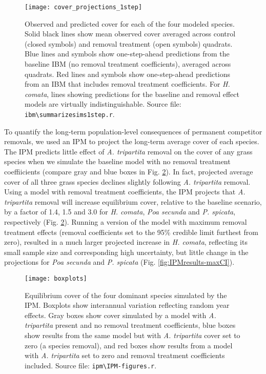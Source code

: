 \documentclass[11pt]{article}
\begin{document}
\begin{doublespacing}
 \begin{figure}[tbp]
 \centering
 \texttt{[image: cover\_projections\_1step]}
 \caption{Observed and predicted cover for each of the four modeled species. Solid black lines show mean observed cover averaged across control (closed symbols) and removal treatment (open symbols) quadrats. Blue lines and symbols show one-step-ahead predictions from the baseline IBM (no removal treatment coefficients), averaged across quadrats. Red lines and symbols show one-step-ahead predictions from an IBM that includes removal treatment coefficients. For \textit{H. comata}, lines showing predictions for the baseline and removal effect models are virtually indistinguishable. Source file: \texttt{ibm\textbackslash summarize\textunderscore sims1step.r}. }
 \label{fig:IBM1step}
 \end{figure}
 
To quantify the long-term population-level consequences of permanent competitor removals, we used an IPM to project the long-term average cover of each species. The IPM predicts little effect of \textit{A. tripartita} removal on the cover of any grass species when we simulate the baseline model with no removal treatment coeffiicients (compare gray and blue boxes in Fig. \ref{fig:IPMresults}). In fact, projected average cover of all three grass species declines slightly following \textit{A. tripartita} removal. 
Using a model with removal treatment coefficients, the IPM projects that \textit{A. tripartita} removal will increase equilibrium cover, relative to the baseline scenario, by a factor of 1.4, 1.5 and 3.0 for \textit{H. comata}, \textit{Poa secunda} and \textit{P. spicata}, respectively (Fig. \ref{fig:IPMresults}). 
Running a version of the model with maximum removal treatment effects (removal coefficients set to the 95\% credible limit furthest from zero), resulted in a much larger projected increase in \textit{H. comata}, reflecting its small sample size and corresponding high uncertainty, but little change in the projections for \textit{Poa secunda} and \textit{P. spicata} (Fig. \ref{fig:IPMresults-maxCI}). 


 \begin{figure}[tbp]
 \centering
 \texttt{[image: boxplots]}
 \caption{Equilibrium cover of the four dominant species simulated by the IPM. Boxplots show interannual variation reflecting random year effects. Gray boxes show cover simulated by a model with \textit{A. tripartita} present and no removal treatment coefficients, blue boxes show results from the same model but with \textit{A. tripartita} cover set to zero (a species removal), and red boxes show results from a model with \textit{A. tripartita} set to zero and removal treatment coefficients included. Source file: \texttt{ipm\textbackslash IPM-figures.r}.}
 \label{fig:IPMresults}
 \end{figure}
 

\end{doublespacing}
\end{document}
